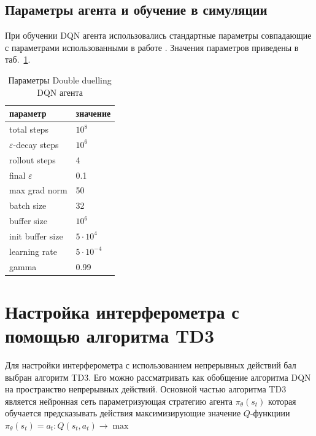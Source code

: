 \subsection{Параметры агента и обучение в симуляции}

При обучении DQN агента использовались стандартные параметры совпадающие с параметрами использованными в работе \cite{mnih2013atari}. Значения параметров приведены в таб.~\ref{tab:dqn_params}.

\begin{table} [htbp]
    \centering
    \begin{threeparttable}%
        \caption{Параметры Double duelling DQN агента}\label{tab:dqn_params}%
        \begin{tabular}{| p{5cm} || p{5cm} |}
            \hline
            \hline
            параметр & значение \\
            \hline
            total steps & $10^8$ \\
            $\varepsilon$-decay steps & $10^6$ \\
            rollout steps & 4 \\
            final $\varepsilon$ & 0.1 \\
            max grad norm & 50 \\
            batch size & 32 \\
            buffer size & $10^6$ \\
            init buffer size & $5 \cdot 10^4$ \\
            learning rate & $5 \cdot 10^{-4}$ \\
            gamma & 0.99 \\
            \hline
            \hline
        \end{tabular}
    \end{threeparttable}
\end{table}

                        
\section{Настройка интерферометра с помощью алгоритма TD3}

Для настройки интерферометра с использованием непрерывных действий бал выбран алгоритм TD3. Его можно рассматривать как обобщение алгоритма DQN на пространство непрерывных действий. Основной частью алгоритма TD3 является нейронная сеть параметризующая стратегию агента $\pi_{\theta}(s_t)$ которая обучается предсказывать действия максимизирующие значение $Q$-функциии $\pi_{\theta}(s_t) = a_t: Q(s_t, a_t) \to \max$

